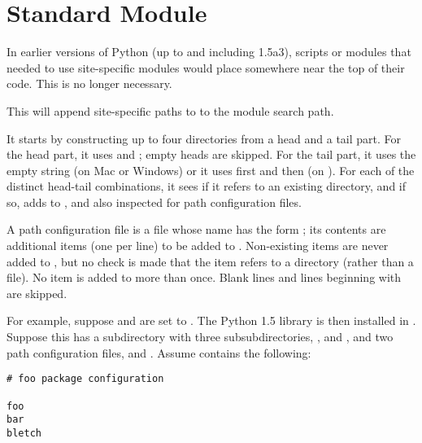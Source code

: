 \section{Standard Module }
\label{module-site}


In earlier versions of Python (up to and including 1.5a3), scripts or
modules that needed to use site-specific modules would place
 somewhere near the top of their code.  This is no
longer necessary.

This will append site-specific paths to to the module search path.

It starts by constructing up to four directories from a head and a
tail part.  For the head part, it uses  and
; empty heads are skipped.  For
the tail part, it uses the empty string (on Mac or Windows) or it uses
first  and then
 (on \UNIX{}).  For each of the distinct
head-tail combinations, it sees if it refers to an existing directory,
and if so, adds to , and also inspected for path
configuration files.

A path configuration file is a file whose name has the form
; its contents are additional items (one
per line) to be added to .  Non-existing items are
never added to , but no check is made that the item
refers to a directory (rather than a file).  No item is added to
 more than once.  Blank lines and lines beginning with
\code{\#} are skipped.

For example, suppose  and  are
set to .  The Python 1.5 library is then installed in
.  Suppose this has a subdirectory
 with three subsubdirectories,
,  and , and two path configuration
files,  and .  Assume 
contains the following:

\bcode\begin{verbatim}
# foo package configuration

foo
bar
bletch
\end{verbatim}\ecode

